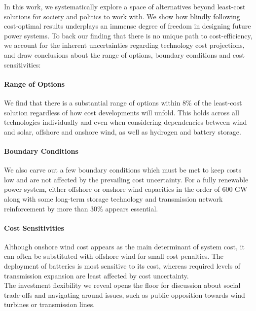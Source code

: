 
In this work, we
systematically explore a space of alternatives beyond least-cost solutions
for society and politics to work with.
We show how blindly following cost-optimal results
underplays an immense degree of freedom in designing future power systems.
To back our finding that there is no unique path to cost-efficiency,
we account for the inherent uncertainties regarding technology cost projections,
and draw conclusions about the range of options, boundary conditions and cost sensitivities:

\paragraph{Range of Options}
We find that there is a substantial range of options
within 8\% of the least-cost solution
regardless of how cost developments will unfold.
This holds across all technologies individually
and even when considering dependencies between
wind and solar, offshore and onshore wind, as well as hydrogen and battery storage.
\paragraph{Boundary Conditions}
We also carve out a few boundary conditions which
must be met to keep costs low and are not affected
by the prevailing cost uncertainty.
For a fully renewable power system,
either offshore or onshore wind capacities
in the order of 600 GW
along with some long-term storage technology and
transmission network reinforcement by more than 30\% appears essential.
\paragraph{Cost Sensitivities}
Although onshore wind cost appears as the main determinant of system cost,
it can often be substituted with offshore wind for small cost penalties.
The deployment of batteries is most sensitive to its cost,
whereas required levels of transmission expansion are least affected by cost uncertainty. \\

The investment flexibility we reveal
opens the floor for discussion about social trade-offs and navigating
around issues, such as public opposition towards wind turbines or transmission lines.

